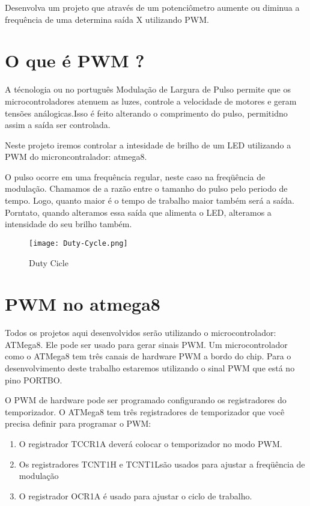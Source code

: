 
Desenvolva um projeto que através de um potenciômetro aumente ou diminua a frequência de uma determina saída X utilizando PWM.

\section{O que é PWM ?}

A técnologia  ou no português Modulação de Largura de Pulso permite que os microcontroladores atenuem as luzes, controle a velocidade de motores e geram tensões análogicas.Isso é feito alterando o comprimento do pulso, permitidno assim a saída ser controlada.

Neste projeto iremos controlar a intesidade de brilho de um LED utilizando a  PWM do microncontralador: atmega8.

O pulso ocorre em uma frequência regular, neste caso na freqüência de modulação. Chamamos de  a razão entre o tamanho do pulso pelo periodo de tempo. Logo, quanto maior é o tempo de trabalho maior também será a saída. Porntato, quando alteramos essa saída que alimenta o LED, alteramos  a intensidade do seu brilho também.

\begin{figure}[htb]
 \caption{Duty Cicle}
 \label{fig:Duty Cicle}
 \centering
 \texttt{[image: Duty-Cycle.png]}
\end{figure}

\section{PWM no atmega8}

Todos os projetos aqui desenvolvidos serão utilizando o microcontrolador: ATMega8. Ele pode ser usado para gerar sinais PWM. Um microcontrolador como o ATMega8 tem três canais de hardware PWM a bordo do chip. Para o desenvolvimento deste trabalho estaremos utilizando o sinal PWM que está no pino PORTBO.

O PWM de hardware pode ser programado configurando os registradores do temporizador. O ATMega8 tem três registradores de temporizador que você precisa definir para programar o PWM:

\begin{enumerate}

\item O registrador TCCR1A deverá colocar o temporizador no modo PWM.
\item Os registradores TCNT1H e TCNT1Lsão usados para ajustar a freqüência de modulação
\item O registrador OCR1A é usado para ajustar o ciclo de trabalho.

\end{enumerate}

